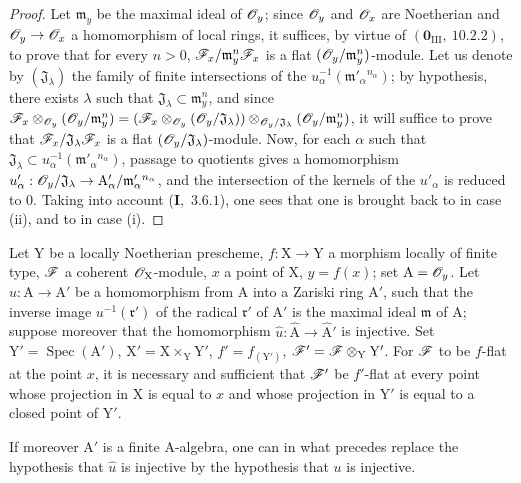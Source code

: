 \begin{proof}
Let $\mathfrak{m}_y$ be the maximal ideal of $\mathscr{O}_y$; since $\mathscr{O}_y$ and $\mathscr{O}_x$ are Noetherian and $\mathscr{O}_y\to\mathscr{O}_x$ a
homomorphism of local rings, it suffices, by virtue of $(\mathbf{0}_{\mathrm{III}},~10.2.2)$, to prove that for
every $n>0$, $\mathscr{F}_x/\mathfrak{m}_y^n\mathscr{F}_x$ is a flat $(\mathscr{O}_y/\mathfrak{m}_y^n)$-module. Let us denote by $(\mathfrak{J}_\lambda)$ the family of
finite intersections of the $u_\alpha^{-1}(\mathfrak{m}'_\alpha{}^{n_\alpha})$; by hypothesis, there exists $\lambda$ such that
$\mathfrak{J}_\lambda\subset\mathfrak{m}_y^n$, and since
$\mathscr{F}_x\otimes_{\mathscr{O}_y}(\mathscr{O}_y/\mathfrak{m}_y^n)=(\mathscr{F}_x\otimes_{\mathscr{O}_y}(\mathscr{O}_y/\mathfrak{J}_\lambda))\otimes_{\mathscr{O}_y/\mathfrak{J}_\lambda}(\mathscr{O}_y/\mathfrak{m}_y^n)$, it will suffice to prove that $\mathscr{F}_x/\mathfrak{J}_\lambda\mathscr{F}_x$ is
a flat $(\mathscr{O}_y/\mathfrak{J}_\lambda)$-module. Now, for each $\alpha$ such that
$\mathfrak{J}_\lambda\subset u_\alpha^{-1}(\mathfrak{m}'_\alpha{}^{n_\alpha})$, passage to quotients gives
a homomorphism $u'_\alpha:\mathscr{O}_y/\mathfrak{J}_\lambda\to\mathrm{A}'_\alpha/\mathfrak{m}'_\alpha{}^{n_\alpha}$, and the intersection of the kernels
of the $u'_\alpha$ is reduced to $0$. Taking into account (\textbf{I},~$3.6.1$), one sees that one is brought back to 
in case (ii), and to  in case (i).
\end{proof}

\begin{corollary}[11.5.2]
\label{IV.11.5.2}
Let $\mathrm{Y}$ be a locally Noetherian prescheme, $f:\mathrm{X}\to\mathrm{Y}$ a
morphism locally of finite type, $\mathscr{F}$ a coherent $\mathscr{O}_\mathrm{X}$-module, $x$ a point of $\mathrm{X}$, $y=f(x)$; set
$\mathrm{A}=\mathscr{O}_y$. Let $u:\mathrm{A}\to\mathrm{A}'$ be a homomorphism from $\mathrm{A}$ into a Zariski ring $\mathrm{A}'$, such that
the inverse image $u^{-1}(\mathfrak{r}')$ of the radical $\mathfrak{r}'$ of $\mathrm{A}'$ is the maximal ideal $\mathfrak{m}$ of $\mathrm{A}$; suppose moreover
that the homomorphism $\hat{u}:\hat{\mathrm{A}}\to\hat{\mathrm{A}}'$ is injective. Set $\mathrm{Y}'=\operatorname{Spec}(\mathrm{A}')$, $\mathrm{X}'=\mathrm{X}\times_\mathrm{Y}\mathrm{Y}'$, $f'=f_{(\mathrm{Y}')}$,
$\mathscr{F}'=\mathscr{F}\otimes_\mathrm{Y}\mathrm{Y}'$. For $\mathscr{F}$ to be $f$-flat at the point $x$, it is necessary and sufficient that $\mathscr{F}'$ be $f'$-flat at every
point whose projection in $\mathrm{X}$ is equal to $x$ and whose projection in $\mathrm{Y}'$ is equal to a closed point
of $\mathrm{Y}'$.

If moreover $\mathrm{A}'$ is a finite $\mathrm{A}$-algebra, one can in what precedes replace the hypothesis that $\hat{u}$
is injective by the hypothesis that $u$ is injective.
\end{corollary}


